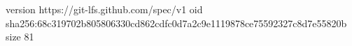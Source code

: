 version https://git-lfs.github.com/spec/v1
oid sha256:68c319702b805806330cd862cdfc0d7a2c9e1119878ce75592327c8d7e55820b
size 81
